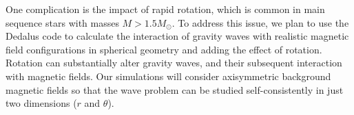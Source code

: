 One complication is the impact of rapid rotation, which is common in main sequence stars with masses $M > 1.5M_\odot$. To address this issue,
we plan to use the Dedalus code to calculate the interaction of gravity waves with realistic magnetic field configurations in spherical geometry \citep[e.g.][]{Braithwaite_2006} 
and adding the effect of rotation. Rotation can substantially alter gravity waves, and their subsequent interaction with magnetic fields. Our simulations will consider axisymmetric background magnetic fields so that the wave problem can be studied self-consistently in just two dimensions ($r$ and $\theta$). 